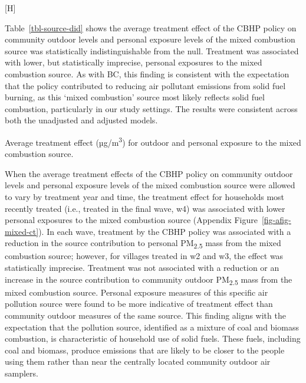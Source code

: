 \documentclass[
  letterpaper,
  DIV=11,
  numbers=noendperiod]{scrartcl}
\makeatletter
\renewenvironment{table}%
   {\renewcommand\familydefault\sfdefault
    \@float{table}}
   {\end@float}
\renewenvironment{figure}%
   {\renewcommand\familydefault\sfdefault
    \@float{figure}}
   {\end@float}
\makeatother
\begin{document}
\begin{figure}[H]


\caption{\label{fig-source-season}Arithmetic mean dispersion normalized
source contributions found from the 4-factor PMF solution for \textbf{A}
outdoor and \textbf{B} personal PM\textsubscript{2.5} exposure samples
by year the group received treatment.}

\end{figure}%

Table~\ref{tbl-source-did} shows the average treatment effect of the
CBHP policy on community outdoor levels and personal exposure levels of
the mixed combustion source was statistically indistinguishable from the
null. Treatment was associated with lower, but statistically imprecise,
personal exposures to the mixed combustion source. As with BC, this
finding is consistent with the expectation that the policy contributed
to reducing air pollutant emissions from solid fuel burning, as this
`mixed combustion' source most likely reflects solid fuel combustion,
particularly in our study settings. The results were consistent across
both the unadjusted and adjusted models.

\begin{table}

\caption{\label{tbl-source-did}Average treatment effect
(µg/m\textsuperscript{3}) for outdoor and personal exposure to the mixed
combustion source.}

\centering{

}

\end{table}%

When the average treatment effects of the CBHP policy on community
outdoor levels and personal exposure levels of the mixed combustion
source were allowed to vary by treatment year and time, the treatment
effect for households most recently treated (i.e., treated in the final
wave, w4) was associated with lower personal exposures to the mixed
combustion source (Appendix Figure~\ref{fig-afig-mixed-ct}). In each
wave, treatment by the CBHP policy was associated with a reduction in
the source contribution to personal PM\textsubscript{2.5} mass from the
mixed combustion source; however, for villages treated in w2 and w3, the
effect was statistically imprecise. Treatment was not associated with a
reduction or an increase in the source contribution to community outdoor
PM\textsubscript{2.5} mass from the mixed combustion source. Personal
exposure measures of this specific air pollution source were found to be
more indicative of treatment effect than community outdoor measures of
the same source. This finding aligns with the expectation that the
pollution source, identified as a mixture of coal and biomass
combustion, is characteristic of household use of solid fuels. These
fuels, including coal and biomass, produce emissions that are likely to
be closer to the people using them rather than near the centrally
located community outdoor air samplers.
\end{document}
